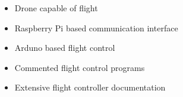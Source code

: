 \begin{itemize}
\item Drone capable of flight	
\item Raspberry Pi based communication interface
\item Arduno based flight control
\item Commented flight control programs
\item Extensive flight controller documentation
\end{itemize}
